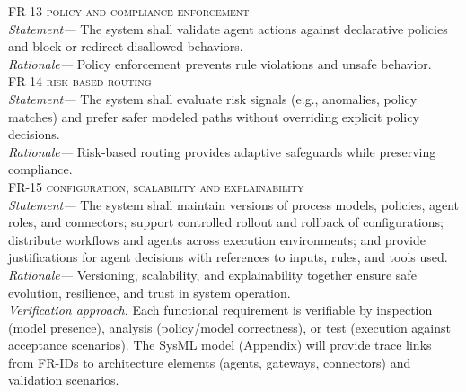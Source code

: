 \begin{footnotesize}
  \noindent \textsc{FR-13 policy and compliance enforcement} \\
  \indent \emph{Statement—} The system shall validate agent actions against declarative policies and block or redirect disallowed behaviors. \\
  \indent \emph{Rationale—} Policy enforcement prevents rule violations and unsafe behavior. \\

  \noindent \textsc{FR-14 risk-based routing} \\
  \indent \emph{Statement—} The system shall evaluate risk signals (e.g., anomalies, policy matches) and prefer safer modeled paths without overriding explicit policy decisions. \\
  \indent \emph{Rationale—} Risk-based routing provides adaptive safeguards while preserving compliance. \\

  \noindent \textsc{FR-15 configuration, scalability and explainability} \\
  \indent \emph{Statement—} The system shall maintain versions of process models, policies, agent roles, and connectors; support controlled rollout and rollback of configurations; distribute workflows and agents across execution environments; and provide justifications for agent decisions with references to inputs, rules, and tools used. \\
  \indent \emph{Rationale—} Versioning, scalability, and explainability together ensure safe evolution, resilience, and trust in system operation. \\

  \noindent\emph{Verification approach.} Each functional requirement is verifiable by inspection (model presence), analysis (policy/model correctness), or test (execution against acceptance scenarios). The SysML model (Appendix) will provide trace links from FR-IDs to architecture elements (agents, gateways, connectors) and validation scenarios.
\end{footnotesize}